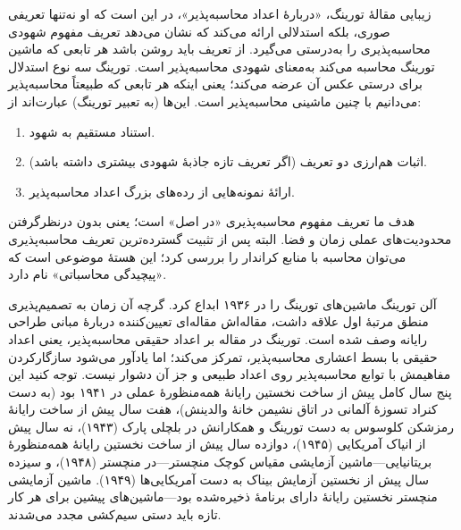 \documentclass[../../../include/open-logic-section]{subfiles}
\begin{document}
\begin{digress}
زیبایی مقالهٔ تورینگ، «دربارهٔ اعداد محاسبه‌پذیر»، در این است که او
نه‌تنها تعریفی صوری، بلکه استدلالی ارائه می‌کند که نشان می‌دهد تعریف
مفهوم شهودی محاسبه‌پذیری را به‌درستی می‌گیرد. از تعریف باید روشن باشد
هر تابعی که ماشین تورینگ محاسبه می‌کند به‌معنای شهودی محاسبه‌پذیر
است. تورینگ سه نوع استدلال برای درستی عکس آن عرضه می‌کند؛ یعنی اینکه
هر تابعی که طبیعتاً محاسبه‌پذیر می‌دانیم با چنین ماشینی محاسبه‌پذیر
است. این‌ها (به تعبیر تورینگ) عبارت‌اند از:
\begin{enumerate}
\item استناد مستقیم به شهود.
\item اثبات هم‌ارزی دو تعریف (اگر تعریف تازه جاذبهٔ شهودی بیشتری داشته باشد).
\item ارائهٔ نمونه‌هایی از رده‌های بزرگ اعداد محاسبه‌پذیر.
\end{enumerate}
هدف ما تعریف مفهوم محاسبه‌پذیری «در اصل» است؛ یعنی بدون درنظرگرفتن
محدودیت‌های عملی زمان و فضا. البته پس از تثبیت گسترده‌ترین تعریف
محاسبه‌پذیری می‌توان محاسبه با منابع کراندار را بررسی کرد؛ این هستهٔ
موضوعی است که «پیچیدگی محاسباتی» نام دارد.
\end{digress}

\begin{history}
آلن تورینگ ماشین‌های تورینگ را در ۱۹۳۶ ابداع کرد. گرچه آن زمان به
تصمیم‌پذیری منطق مرتبهٔ اول علاقه داشت، مقاله‌اش مقاله‌ای تعیین‌کننده
دربارهٔ مبانی طراحی رایانه وصف شده است. تورینگ در مقاله بر اعداد حقیقی
محاسبه‌پذیر، یعنی اعداد حقیقی با بسط اعشاری محاسبه‌پذیر، تمرکز می‌کند؛
اما یادآور می‌شود سازگارکردن مفاهیمش با توابع محاسبه‌پذیر روی اعداد
طبیعی و جز آن دشوار نیست. توجه کنید این پنج سال کامل پیش از ساخت
نخستین رایانهٔ همه‌منظورهٔ عملی در ۱۹۴۱ بود (به دست کنراد تسوزهٔ
آلمانی در اتاق نشیمن خانهٔ والدینش)، هفت سال پیش از ساخت رایانهٔ
رمزشکن کلوسوس به دست تورینگ و همکارانش در بلچلی پارک (۱۹۴۳)، نه سال
پیش از انیاک آمریکایی (۱۹۴۵)، دوازده سال پیش از ساخت نخستین رایانهٔ
همه‌منظورهٔ بریتانیایی---ماشین آزمایشی مقیاس کوچک منچستر---در منچستر
(۱۹۴۸)، و سیزده سال پیش از نخستین آزمایش بیناک به دست آمریکایی‌ها
(۱۹۴۹). ماشین آزمایشی منچستر نخستین رایانهٔ دارای برنامهٔ ذخیره‌شده
بود---ماشین‌های پیشین برای هر کار تازه باید دستی سیم‌کشی مجدد می‌شدند.
\end{history}
\end{document}
